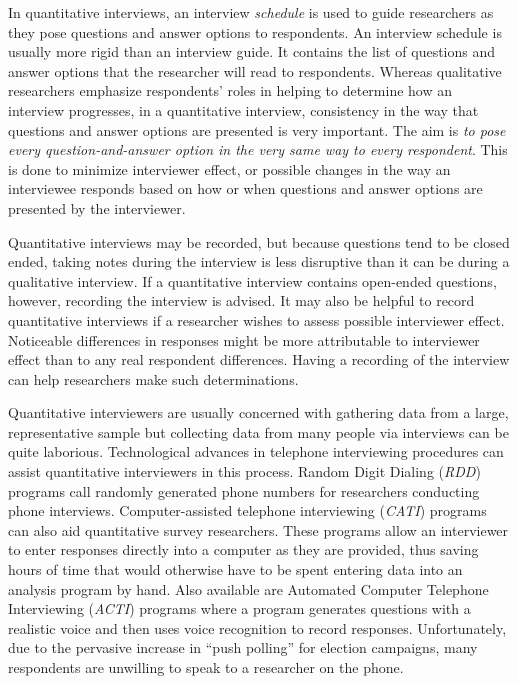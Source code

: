 In quantitative interviews, an interview \textit{schedule} is used to guide researchers as they pose questions and answer options to respondents. An interview schedule is usually more rigid than an interview guide. It contains the list of questions and answer options that the researcher will read to respondents. Whereas qualitative researchers emphasize respondents' roles in helping to determine how an interview progresses, in a quantitative interview, consistency in the way that questions and answer options are presented is very important. The aim is \textit{to pose every question-and-answer option in the very same way to every respondent}. This is done to minimize interviewer effect, or possible changes in the way an interviewee responds based on how or when questions and answer options are presented by the interviewer.

Quantitative interviews may be recorded, but because questions tend to be closed ended, taking notes during the interview is less disruptive than it can be during a qualitative interview. If a quantitative interview contains open-ended questions, however, recording the interview is advised. It may also be helpful to record quantitative interviews if a researcher wishes to assess possible interviewer effect. Noticeable differences in responses might be more attributable to interviewer effect than to any real respondent differences. Having a recording of the interview can help researchers make such determinations.

Quantitative interviewers are usually concerned with gathering data from a large, representative sample but collecting data from many people via interviews can be quite laborious. Technological advances in telephone interviewing procedures can assist quantitative interviewers in this process. Random Digit Dialing (\textit{RDD}) programs call randomly generated phone numbers for researchers conducting phone interviews. Computer-assisted telephone interviewing (\textit{CATI}) programs can also aid quantitative survey researchers. These programs allow an interviewer to enter responses directly into a computer as they are provided, thus saving hours of time that would otherwise have to be spent entering data into an analysis program by hand. Also available are Automated Computer Telephone Interviewing (\textit{ACTI}) programs where a program generates questions with a realistic voice and then uses voice recognition to record responses. Unfortunately, due to the pervasive increase in ``push polling'' for election campaigns, many respondents are unwilling to speak to a researcher on the phone.

